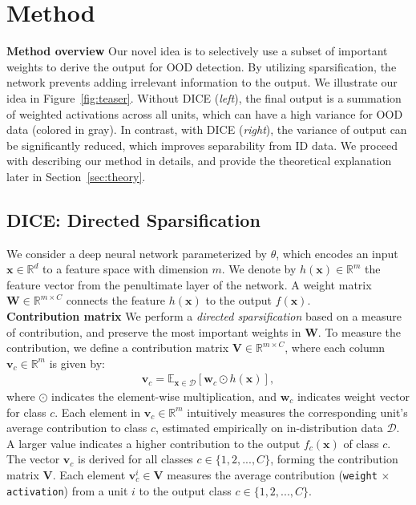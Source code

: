 \documentclass[runningheads]{llncs}
\def\*#1{\mathbf{#1}}
\begin{document}
\section{Method}
\label{sec:method}

\noindent \textbf{Method overview} Our novel idea is to selectively use a subset of important weights to derive the output for OOD detection. By utilizing sparsification, the network prevents adding irrelevant information to the output. We illustrate our idea in Figure~\ref{fig:teaser}. Without DICE (\emph{left}), the final output is a summation of weighted activations across all units, which can have a high variance for OOD data (colored in gray). In contrast, with DICE (\emph{right}), the variance of output can be significantly reduced, which improves separability from ID data. We proceed with describing our method in details, and provide the theoretical explanation later in Section~\ref{sec:theory}.


\subsection{DICE: Directed Sparsification}
\label{sec:dks}
We consider a deep neural network parameterized by $\theta$, which encodes an input $\*x \in \mathbb{R}^d$ to a feature space with dimension $m$. We denote by $ h(\*x) \in \mathbb{R}^m$ the feature vector from the penultimate layer of the network.
A weight matrix $\mathbf{W} \in \mathbb{R}^{m\times C}$ connects the feature $h(\*x)$ to the output $f(\*x)$. \\

\noindent \textbf{Contribution matrix} We perform a \emph{directed sparsification} based on a measure of contribution, and preserve the most important weights in $\*W$. To measure the contribution, we define a contribution matrix $\*V \in \mathbb{R}^{m\times C}$, where each column $\*v_c \in \mathbb{R}^m$ is given by:
\begin{align}
\*v_c = \mathbb{E}_{\*x\in \mathcal{D}} [\*w_c \odot h(\*x)],
\end{align}
where $\odot$ indicates the element-wise multiplication, and $\*w_c$ indicates weight vector for class $c$. Each element in $\*v_c \in \mathbb{R}^m$ intuitively measures the corresponding unit's average contribution to class $c$, estimated empirically on in-distribution data $\mathcal{D}$. A larger value indicates a higher contribution to the output $f_c(\*x)$ of class $c$. The vector $\*v_c$ is derived for all classes  $c \in \{1,2,...,C\}$, forming the contribution matrix $\*V$. Each element $\*v_{c}^i\in\*V$ measures the average contribution (\texttt{weight} $\times$ \texttt{activation}) from a unit $i$ to the output class $c\in \{1,2,...,C\}$. 
\end{document}
